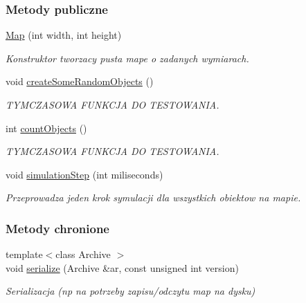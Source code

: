\subsubsection*{Metody publiczne}
\begin{DoxyCompactItemize}
\item 
\hypertarget{classMap_a8497952fd6e1f0584d868e6ceb97d42d}{\hyperlink{classMap_a8497952fd6e1f0584d868e6ceb97d42d}{Map} (int width, int height)}\label{classMap_a8497952fd6e1f0584d868e6ceb97d42d}

\begin{DoxyCompactList}\small\item\em Konstruktor tworzacy pusta mape o zadanych wymiarach. \end{DoxyCompactList}\item 
void \hyperlink{classMap_a2ea398c824a67d162ce4017b9173d685}{create\-Some\-Random\-Objects} ()
\begin{DoxyCompactList}\small\item\em T\-Y\-M\-C\-Z\-A\-S\-O\-W\-A F\-U\-N\-K\-C\-J\-A D\-O T\-E\-S\-T\-O\-W\-A\-N\-I\-A. \end{DoxyCompactList}\item 
int \hyperlink{classMap_ade3f961a8981ef66c159f968e4f98eb4}{count\-Objects} ()
\begin{DoxyCompactList}\small\item\em T\-Y\-M\-C\-Z\-A\-S\-O\-W\-A F\-U\-N\-K\-C\-J\-A D\-O T\-E\-S\-T\-O\-W\-A\-N\-I\-A. \end{DoxyCompactList}\item 
void \hyperlink{classMap_a71d87cb69a70ab3b3c2dc4ad39d13fcc}{simulation\-Step} (int miliseconds)
\begin{DoxyCompactList}\small\item\em Przeprowadza jeden krok symulacji dla wszystkich obiektow na mapie. \end{DoxyCompactList}\end{DoxyCompactItemize}
\subsubsection*{Metody chronione}
\begin{DoxyCompactItemize}
\item 
{\footnotesize template$<$class Archive $>$ }\\void \hyperlink{classMap_a247075c0c8b390cdd3afab8f627d1e8d}{serialize} (Archive \&ar, const unsigned int version)
\begin{DoxyCompactList}\small\item\em Serializacja (np na potrzeby zapisu/odczytu map na dysku) \end{DoxyCompactList}\end{DoxyCompactItemize}
